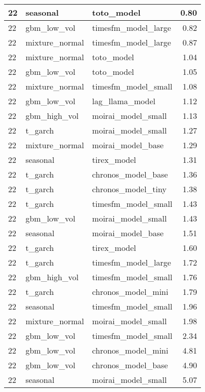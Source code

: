 {\begin{tabular}{lllr}
\midrule
22 & seasonal & toto\_model & 0.80 \\
\midrule
22 & gbm\_low\_vol & timesfm\_model\_large & 0.82 \\
\midrule
22 & mixture\_normal & timesfm\_model\_large & 0.87 \\
\midrule
22 & mixture\_normal & toto\_model & 1.04 \\
\midrule
22 & gbm\_low\_vol & toto\_model & 1.05 \\
\midrule
22 & mixture\_normal & timesfm\_model\_small & 1.08 \\
\midrule
22 & gbm\_low\_vol & lag\_llama\_model & 1.12 \\
\midrule
22 & gbm\_high\_vol & moirai\_model\_small & 1.13 \\
\midrule
22 & t\_garch & moirai\_model\_small & 1.27 \\
\midrule
22 & mixture\_normal & moirai\_model\_base & 1.29 \\
\midrule
22 & seasonal & tirex\_model & 1.31 \\
\midrule
22 & t\_garch & chronos\_model\_base & 1.36 \\
\midrule
22 & t\_garch & chronos\_model\_tiny & 1.38 \\
\midrule
22 & t\_garch & timesfm\_model\_small & 1.43 \\
\midrule
22 & gbm\_low\_vol & moirai\_model\_small & 1.43 \\
\midrule
22 & seasonal & moirai\_model\_base & 1.51 \\
\midrule
22 & t\_garch & tirex\_model & 1.60 \\
\midrule
22 & t\_garch & timesfm\_model\_large & 1.72 \\
\midrule
22 & gbm\_high\_vol & timesfm\_model\_small & 1.76 \\
\midrule
22 & t\_garch & chronos\_model\_mini & 1.79 \\
\midrule
22 & seasonal & timesfm\_model\_small & 1.96 \\
\midrule
22 & mixture\_normal & moirai\_model\_small & 1.98 \\
\midrule
22 & gbm\_low\_vol & timesfm\_model\_small & 2.34 \\
\midrule
22 & gbm\_low\_vol & chronos\_model\_mini & 4.81 \\
\midrule
22 & gbm\_low\_vol & chronos\_model\_base & 4.90 \\
\midrule
22 & seasonal & moirai\_model\_small & 5.07 \\
\bottomrule
\end{tabular}
}